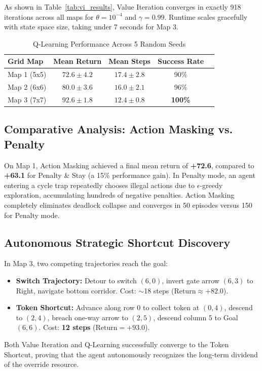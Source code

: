 \documentclass[conference]{IEEEtran}
\begin{document}
As shown in Table~\ref{tab:vi_results}, Value Iteration converges in exactly 918 iterations across all maps for $\theta = 10^{-4}$ and $\gamma = 0.99$. Runtime scales gracefully with state space size, taking under 7 seconds for Map 3.

\begin{table}[htbp]
\caption{Q-Learning Performance Across 5 Random Seeds}
\begin{center}
\begin{tabular}{lcccc}
\toprule
\textbf{Grid Map} & \textbf{Mean Return} & \textbf{Mean Steps} & \textbf{Success Rate} \\
\midrule
Map 1 (5x5) & $72.6 \pm 4.2$ & $17.4 \pm 2.8$ & 90\% \\
Map 2 (6x6) & $80.0 \pm 3.6$ & $16.0 \pm 2.1$ & 96\% \\
Map 3 (7x7) & $\mathbf{92.6 \pm 1.8}$ & $\mathbf{12.4 \pm 0.8}$ & \textbf{100\%} \\
\bottomrule
\end{tabular}
\label{tab:ql_results}
\end{center}
\end{table}

\subsection{Comparative Analysis: Action Masking vs. Penalty}
On Map 1, Action Masking achieved a final mean return of \textbf{+72.6}, compared to \textbf{+63.1} for Penalty \& Stay (a 15\% performance gain). In Penalty mode, an agent entering a cycle trap repeatedly chooses illegal actions due to $\epsilon$-greedy exploration, accumulating hundreds of negative penalties. Action Masking completely eliminates deadlock collapse and converges in 50 episodes versus 150 for Penalty mode.

\subsection{Autonomous Strategic Shortcut Discovery}
In Map 3, two competing trajectories reach the goal:
\begin{itemize}
    \item \textbf{Switch Trajectory:} Detour to switch $(6, 0)$, invert gate arrow $(6, 3)$ to Right, navigate bottom corridor. Cost: $\sim$18 steps ($\text{Return} \approx +82.0$).
    \item \textbf{Token Shortcut:} Advance along row 0 to collect token at $(0, 4)$, descend to $(2, 4)$, breach one-way arrow to $(2, 5)$, descend column 5 to Goal $(6, 6)$. Cost: \textbf{12 steps} ($\text{Return} = \mathbf{+93.0}$).
\end{itemize}
Both Value Iteration and Q-Learning successfully converge to the Token Shortcut, proving that the agent autonomously recognizes the long-term dividend of the override resource.
\end{document}
